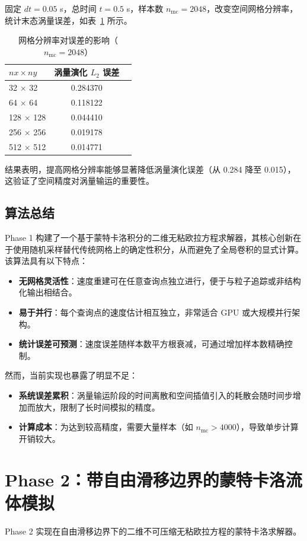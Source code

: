 \documentclass[UTF8,fontset=fandol]{ctexart}
\begin{document}
固定 $dt = 0.05$ s，总时间 $t = 0.5$ s，样本数 $n_{\mathrm{mc}}=2048$，改变空间网格分辨率，统计末态涡量误差，如表~\ref{tab:grid} 所示。

\begin{table}[htbp]
\centering
\caption{网格分辨率对误差的影响（$n_{\mathrm{mc}}=2048$）}
\label{tab:grid}
\begin{tabular}{lcc}
\toprule
$nx \times ny$ &  涡量演化 $L_2$ 误差 \\
\midrule
32 $\times$ 32  &  0.284370 \\
64 $\times$ 64  &  0.118122 \\
128 $\times$ 128 & 0.044410 \\
256 $\times$ 256 & 0.019178 \\
512 $\times$ 512 &  0.014771 \\
\bottomrule
\end{tabular}
\end{table}



结果表明，提高网格分辨率能够显著降低涡量演化误差（从 0.284 降至 0.015），这验证了空间精度对涡量输运的重要性。

\subsection{算法总结}

Phase 1 构建了一个基于蒙特卡洛积分的二维无粘欧拉方程求解器，其核心创新在于使用随机采样替代传统网格上的确定性积分，从而避免了全局卷积的显式计算。该算法具有以下特点：
\begin{itemize}
    \item \textbf{无网格灵活性}：速度重建可在任意查询点独立进行，便于与粒子追踪或非结构化输出相结合。
    \item \textbf{易于并行}：每个查询点的速度估计相互独立，非常适合 GPU 或大规模并行架构。
    \item \textbf{统计误差可预测}：速度误差随样本数平方根衰减，可通过增加样本数精确控制。
\end{itemize}
然而，当前实现也暴露了明显不足：
\begin{itemize}
    \item \textbf{系统误差累积}：涡量输运阶段的时间离散和空间插值引入的耗散会随时间步增加而放大，限制了长时间模拟的精度。
    \item \textbf{计算成本}：为达到较高精度，需要大量样本（如 $n_{\mathrm{mc}}>4000$），导致单步计算开销较大。
\end{itemize}

\section{Phase 2：带自由滑移边界的蒙特卡洛流体模拟}
Phase 2 实现在自由滑移边界下的二维不可压缩无粘欧拉方程的蒙特卡洛求解器。
\end{document}
